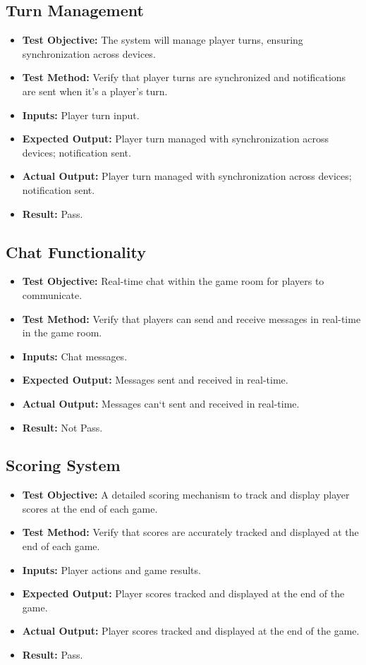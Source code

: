 \documentclass[12pt, titlepage]{article}
\begin{document}
\subsection{Turn Management}
\begin{itemize}
    \item \textbf{Test Objective:} The system will manage player turns, ensuring synchronization across devices.
    \item \textbf{Test Method:} Verify that player turns are synchronized and notifications are sent when it's a player's turn.
    \item \textbf{Inputs:} Player turn input.
    \item \textbf{Expected Output:} Player turn managed with synchronization across devices; notification sent.
    \item \textbf{Actual Output:} Player turn managed with synchronization across devices; notification sent.
    \item \textbf{Result:} Pass.
\end{itemize}

\subsection{Chat Functionality}
\begin{itemize}
    \item \textbf{Test Objective:} Real-time chat within the game room for players to communicate.
    \item \textbf{Test Method:} Verify that players can send and receive messages in real-time in the game room.
    \item \textbf{Inputs:} Chat messages.
    \item \textbf{Expected Output:} Messages sent and received in real-time.
    \item \textbf{Actual Output:} Messages can‘t sent and received in real-time.
    \item \textbf{Result:} Not Pass.
\end{itemize}

\subsection{Scoring System}
\begin{itemize}
    \item \textbf{Test Objective:} A detailed scoring mechanism to track and display player scores at the end of each game.
    \item \textbf{Test Method:} Verify that scores are accurately tracked and displayed at the end of each game.
    \item \textbf{Inputs:} Player actions and game results.
    \item \textbf{Expected Output:} Player scores tracked and displayed at the end of the game.
    \item \textbf{Actual Output:} Player scores tracked and displayed at the end of the game.
    \item \textbf{Result:} Pass.
\end{itemize}
\end{document}
